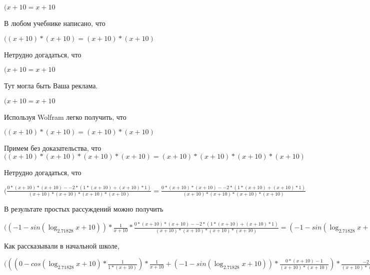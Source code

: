 \documentclass[12pt,a4paper,fleqn]{article}
\theoremstyle{definition}
\begin{document}
$( x  +  10  =  x  +  10 $

В любом учебнике написано, что

$(( x  +  10 ) * ( x  +  10 ) = ( x  +  10 ) * ( x  +  10 )$

Нетрудно догадаться, что

$( x  +  10  =  x  +  10 $

Тут могла быть Ваша реклама.

$( x  +  10  =  x  +  10 $

Используя Wolfram легко получить, что

$(( x  +  10 ) * ( x  +  10 ) = ( x  +  10 ) * ( x  +  10 )$

Примем без доказательства, что
$(( x  +  10 ) * ( x  +  10 ) * ( x  +  10 ) * ( x  +  10 ) = ( x  +  10 ) * ( x  +  10 ) * ( x  +  10 ) * ( x  +  10 )$

Нетрудно догадаться, что

$(\frac{ 0  * ( x  +  10 ) * ( x  +  10 ) -  -2  * ( 1  * ( x  +  10 ) + ( x  +  10 ) *  1 )}{( x  +  10 ) * ( x  +  10 ) * ( x  +  10 ) * ( x  +  10 )}
 = \frac{ 0  * ( x  +  10 ) * ( x  +  10 ) -  -2  * ( 1  * ( x  +  10 ) + ( x  +  10 ) *  1 )}{( x  +  10 ) * ( x  +  10 ) * ( x  +  10 ) * ( x  +  10 )}
$

В результате простых рассуждений можно получить

$(( -1  - sin(\log_{ 2.71828 }{ x  +  10 })) * \frac{ 1 }{ x  +  10 }
 * \frac{ 0  * ( x  +  10 ) * ( x  +  10 ) -  -2  * ( 1  * ( x  +  10 ) + ( x  +  10 ) *  1 )}{( x  +  10 ) * ( x  +  10 ) * ( x  +  10 ) * ( x  +  10 )}
 = ( -1  - sin(\log_{ 2.71828 }{ x  +  10 })) * \frac{ 1 }{ x  +  10 }
 * \frac{ 0  * ( x  +  10 ) * ( x  +  10 ) -  -2  * ( 1  * ( x  +  10 ) + ( x  +  10 ) *  1 )}{( x  +  10 ) * ( x  +  10 ) * ( x  +  10 ) * ( x  +  10 )}
$

Как рассказывали в начальной школе,

$((( 0  - cos(\log_{ 2.71828 }{ x  +  10 }) * \frac{ 1 }{ 1  * ( x  +  10 )}
) * \frac{ 1 }{ x  +  10 }
 + ( -1  - sin(\log_{ 2.71828 }{ x  +  10 })) * \frac{ 0  * ( x  +  10 ) -  1 }{( x  +  10 ) * ( x  +  10 )}
) * \frac{ -2 }{( x  +  10 ) * ( x  +  10 )}
 + ( -1  - sin(\log_{ 2.71828 }{ x  +  10 })) * \frac{ 1 }{ x  +  10 }
 * \frac{ 0  * ( x  +  10 ) * ( x  +  10 ) -  -2  * ( 1  * ( x  +  10 ) + ( x  +  10 ) *  1 )}{( x  +  10 ) * ( x  +  10 ) * ( x  +  10 ) * ( x  +  10 )}
 = (( 0  - cos(\log_{ 2.71828 }{ x  +  10 }) * \frac{ 1 }{ 1  * ( x  +  10 )}
) * \frac{ 1 }{ x  +  10 }
 + ( -1  - sin(\log_{ 2.71828 }{ x  +  10 })) * \frac{ 0  * ( x  +  10 ) -  1 }{( x  +  10 ) * ( x  +  10 )}
) * \frac{ -2 }{( x  +  10 ) * ( x  +  10 )}
 + ( -1  - sin(\log_{ 2.71828 }{ x  +  10 })) * \frac{ 1 }{ x  +  10 }
 * \frac{ 0  * ( x  +  10 ) * ( x  +  10 ) -  -2  * ( 1  * ( x  +  10 ) + ( x  +  10 ) *  1 )}{( x  +  10 ) * ( x  +  10 ) * ( x  +  10 ) * ( x  +  10 )}
$
\end{document}
